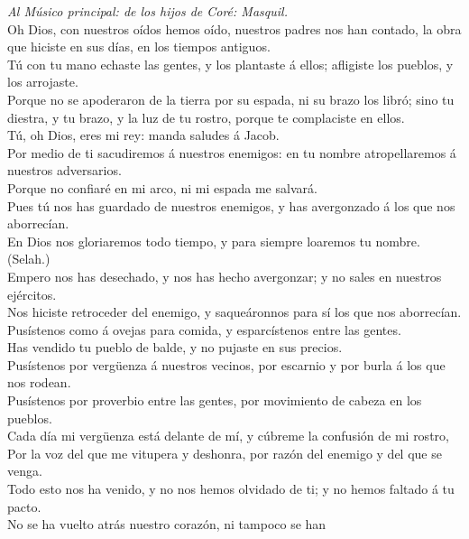  \emph{Al Músico principal: de los hijos de Coré:
Masquil.}\\
Oh Dios, con nuestros oídos hemos oído, nuestros padres nos han contado,
la obra que hiciste en sus días, en los tiempos antiguos.\\
 Tú con tu mano echaste las gentes, y los plantaste á ellos;
afligiste los pueblos, y los arrojaste.\\
 Porque no se apoderaron de la tierra por su espada, ni su
brazo los libró; sino tu diestra, y tu brazo, y la luz de tu rostro,
porque te complaciste en ellos.\\
 Tú, oh Dios, eres mi rey: manda saludes á Jacob.\\
 Por medio de ti sacudiremos á nuestros enemigos: en tu
nombre atropellaremos á nuestros adversarios.\\
 Porque no confiaré en mi arco, ni mi espada me salvará.\\
 Pues tú nos has guardado de nuestros enemigos, y has
avergonzado á los que nos aborrecían.\\
 En Dios nos gloriaremos todo tiempo, y para siempre
loaremos tu nombre. (Selah.)\\
 Empero nos has desechado, y nos has hecho avergonzar; y no
sales en nuestros ejércitos.\\
 Nos hiciste retroceder del enemigo, y saqueáronnos para sí
los que nos aborrecían.\\
 Pusístenos como á ovejas para comida, y esparcístenos
entre las gentes.\\
 Has vendido tu pueblo de balde, y no pujaste en sus
precios.\\
 Pusístenos por vergüenza á nuestros vecinos, por escarnio
y por burla á los que nos rodean.\\
 Pusístenos por proverbio entre las gentes, por movimiento
de cabeza en los pueblos.\\
 Cada día mi vergüenza está delante de mí, y cúbreme la
confusión de mi rostro,\\
 Por la voz del que me vitupera y deshonra, por razón del
enemigo y del que se venga.\\
 Todo esto nos ha venido, y no nos hemos olvidado de ti; y
no hemos faltado á tu pacto.\\
 No se ha vuelto atrás nuestro corazón, ni tampoco se han
